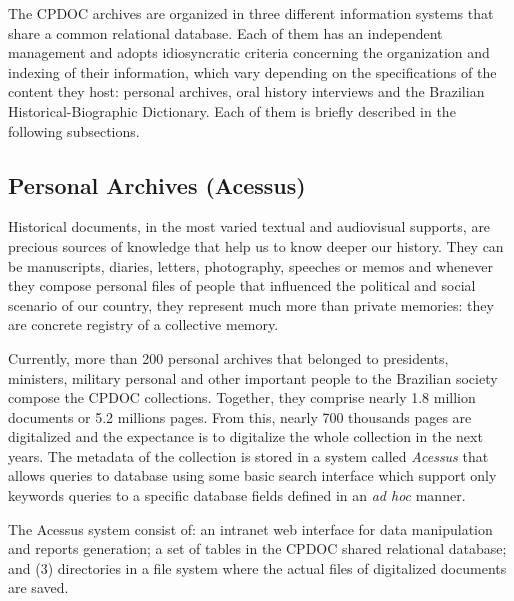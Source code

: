 \documentclass{llncs}
\begin{document}

The CPDOC archives are organized in three different information
systems that share a common relational database. Each of them has an
independent management and adopts idiosyncratic criteria concerning
the organization and indexing of their information, which vary
depending on the specifications of the content they host: personal
archives, oral history interviews and the Brazilian
Historical-Biographic Dictionary. Each of them is briefly described in
the following subsections.

\subsection{Personal Archives (Acessus)}

Historical documents, in the most varied textual and audiovisual
supports, are precious sources of knowledge that help us to know
deeper our history. They can be manuscripts, diaries, letters,
photography, speeches or memos and whenever they compose personal
files of people that influenced the political and social scenario of
our country, they represent much more than private memories: they are
concrete registry of a collective memory.

Currently, more than 200 personal archives that belonged to
presidents, ministers, military personal and other important people to
the Brazilian society compose the CPDOC collections. Together, they
comprise nearly 1.8 million documents or 5.2 millions pages. From
this, nearly 700 thousands pages are digitalized and the expectance is
to digitalize the whole collection in the next years. The metadata of
the collection is stored in a system called \emph{Acessus} that allows
queries to database using some basic search interface which support
only keywords queries to a specific database fields defined in an
\emph{ad hoc} manner.

The Acessus system consist of: an intranet web interface for data
manipulation and reports generation; a set of tables in the CPDOC
shared relational database; and (3) directories in a file system where
the actual files of digitalized documents are saved.
\end{document}
